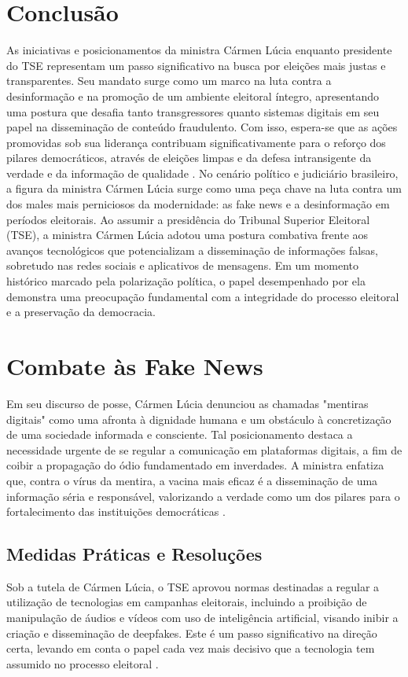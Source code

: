\documentclass[
   article,       
   12pt,          
   oneside,       
   a4paper,       
   english,       
   brazil,        
   sumario=tradicional
   ]{abntex2}
\begin{document}
\section{Conclusão}
As iniciativas e posicionamentos da ministra Cármen Lúcia enquanto presidente do TSE representam um passo significativo na busca por eleições mais justas e transparentes. Seu mandato surge como um marco na luta contra a desinformação e na promoção de um ambiente eleitoral íntegro, apresentando uma postura que desafia tanto transgressores quanto sistemas digitais em seu papel na disseminação de conteúdo fraudulento. Com isso, espera-se que as ações promovidas sob sua liderança contribuam significativamente para o reforço dos pilares democráticos, através de eleições limpas e da defesa intransigente da verdade e da informação de qualidade \cite{Mendonca_e_o_unico_ministro_do_STF_a_faltar_a, Pacheco_participa_da_posse_na_Carmen_Lucia_na}.
No cenário político e judiciário brasileiro, a figura da ministra Cármen Lúcia surge como uma peça chave na luta contra um dos males mais perniciosos da modernidade: as fake news e a desinformação em períodos eleitorais. Ao assumir a presidência do Tribunal Superior Eleitoral (TSE), a ministra Cármen Lúcia adotou uma postura combativa frente aos avanços tecnológicos que potencializam a disseminação de informações falsas, sobretudo nas redes sociais e aplicativos de mensagens. Em um momento histórico marcado pela polarização política, o papel desempenhado por ela demonstra uma preocupação fundamental com a integridade do processo eleitoral e a preservação da democracia. 

\section{Combate às Fake News}
Em seu discurso de posse, Cármen Lúcia denunciou as chamadas "mentiras digitais" como uma afronta à dignidade humana e um obstáculo à concretização de uma sociedade informada e consciente. Tal posicionamento destaca a necessidade urgente de se regular a comunicação em plataformas digitais, a fim de coibir a propagação do ódio fundamentado em inverdades. A ministra enfatiza que, contra o vírus da mentira, a vacina mais eficaz é a disseminação de uma informação séria e responsável, valorizando a verdade como um dos pilares para o fortalecimento das instituições democráticas \cite{Contra_o_virus_da_mentira_ha_o_remedio_da_inf}.

\subsection{Medidas Práticas e Resoluções}
Sob a tutela de Cármen Lúcia, o TSE aprovou normas destinadas a regular a utilização de tecnologias em campanhas eleitorais, incluindo a proibição de manipulação de áudios e vídeos com uso de inteligência artificial, visando inibir a criação e disseminação de deepfakes. Este é um passo significativo na direção certa, levando em conta o papel cada vez mais decisivo que a tecnologia tem assumido no processo eleitoral \cite{Carmen_Lucia_toma_posse_na_presidencia_do_TSE}.
\end{document}
